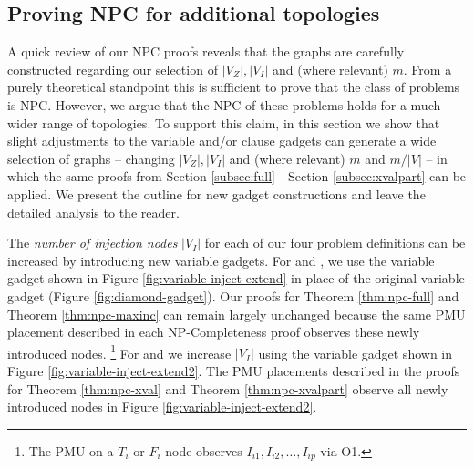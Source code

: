 \subsection{Proving NPC for additional topologies} %
\label{subsec:extend}

A quick review of our NPC proofs reveals that the graphs are carefully constructed regarding our selection of $|V_Z|, |V_I|$ and (where relevant) $m$. From a purely theoretical standpoint this is sufficient to prove that the class of problems is NPC. However, we argue that the NPC of these problems holds for a much wider range of topologies. To support this claim, in this section we show that slight adjustments to the variable and/or clause gadgets can generate a wide selection of graphs -- changing  $|V_Z|, |V_I|$ and (where relevant) $m$ and $m/|V|$ -- in which the same proofs from Section \ref{subsec:full} - Section \ref{subsec:xvalpart} can be applied. We present the outline for new gadget constructions and leave the detailed analysis to the reader.


The {\em number of injection nodes} $|V_I|$ for each of our four problem definitions can be increased by introducing new variable gadgets.
For \full and \maxincs, we use the variable gadget shown in Figure \ref{fig:variable-inject-extend} in place of the original
variable gadget (Figure \ref{fig:diamond-gadget}). Our proofs for Theorem \ref{thm:npc-full} and Theorem \ref{thm:npc-maxinc} can remain largely unchanged because
the same PMU placement described in each NP-Completeness proof observes these newly introduced nodes.
{\footnote {\small The PMU on a $T_i$ or $F_i$ node observes $I_{i1}, I_{i2}, \dots ,I_{ip}$ via O1. }}
For \xval and \xvalpart we increase $|V_I|$ using the variable gadget shown in Figure \ref{fig:variable-inject-extend2}.  The PMU placements described in the proofs
for Theorem \ref{thm:npc-xval} and Theorem \ref{thm:npc-xvalpart} observe all newly introduced nodes in Figure \ref{fig:variable-inject-extend2}.

